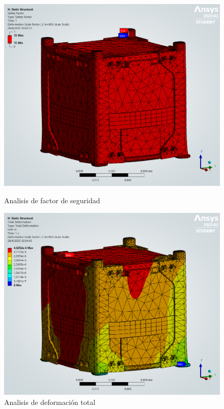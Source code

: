       \begin{figure}[H]
        \begin{minipage}{0.5\textwidth}
          \centering
          \includegraphics[width=\textwidth]{image/fem/ansys_cubesat-static_safety.png}
          \caption{Analisis de factor de seguridad}
          \label{fig:fem_static_safety}
        \end{minipage}
        \begin{minipage}{0.5\textwidth}
          \centering
          \includegraphics[width=\textwidth]{image/fem/ansys_cubesat-static_deformation.png}
          \caption{Analisis de deformación total}
          \label{fig:fem_static_deformation}
        \end{minipage}
      \end{figure}

